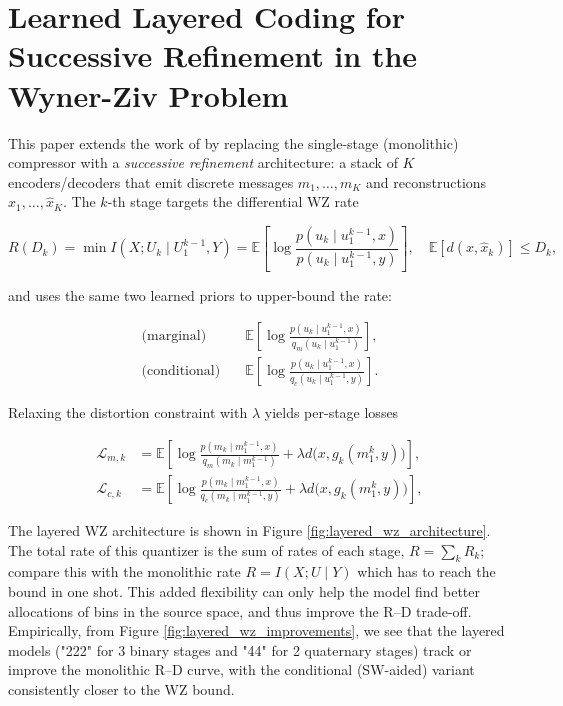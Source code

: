 \section{Learned Layered Coding for Successive Refinement in the Wyner-Ziv Problem}

This paper \cite{JoukovskyLayeredWZ} extends the work of \cite{OzyilkanRecoverBinning} by replacing the single-stage (monolithic) compressor with a \emph{successive refinement} architecture: a stack of $K$ encoders/decoders that emit discrete messages $m_1,\ldots,m_K$ and reconstructions $\hat{x}_1,\ldots,\hat{x}_K$. The $k$-th stage targets the differential WZ rate

\begin{equation}
    R(D_k)=\min I(X;U_k\mid U_1^{k-1},Y)=\mathbb{E}\left[\log\frac{p(u_k\mid u_1^{k-1},x)}{p(u_k\mid u_1^{k-1},y)}\right],\quad \mathbb{E}[d(x,\hat{x}_k)]\le D_k,
\end{equation}

and uses the same two learned priors to upper-bound the rate:

\begin{align}
    \text{(marginal)}\quad &\mathbb{E}\left[\log\frac{p(u_k\mid u_1^{k-1},x)}{q_m(u_k\mid u_1^{k-1})}\right],\\
    \text{(conditional)}\quad &\mathbb{E}\left[\log\frac{p(u_k\mid u_1^{k-1},x)}{q_c(u_k\mid u_1^{k-1},y)}\right].
\end{align}

Relaxing the distortion constraint with $\lambda$ yields per-stage losses

\begin{align}
    \mathcal{L}_{m,k}&=\mathbb{E}\left[\log\frac{p(m_k\mid m_1^{k-1},x)}{q_m(m_k\mid m_1^{k-1})}+\lambda d\big(x,g_k(m_1^{k},y)\big)\right],\\
    \mathcal{L}_{c,k}&=\mathbb{E}\left[\log\frac{p(m_k\mid m_1^{k-1},x)}{q_c(m_k\mid m_1^{k-1},y)}+\lambda d\big(x,g_k(m_1^{k},y)\big)\right],
\end{align}

The layered WZ architecture is shown in Figure \ref{fig:layered_wz_architecture}.
The total rate of this quantizer is the sum of rates of each stage, $R=\sum_k R_k$; compare this with the monolithic rate $R=I(X;U\mid Y)$ which has to reach the bound in one shot. This added flexibility can only help the model find better allocations of bins in the source space, and thus improve the R–D trade-off.
Empirically, from Figure \ref{fig:layered_wz_improvements}, we see that the layered models ("222" for 3 binary stages and "44" for 2 quaternary stages) track or improve the monolithic R–D curve, with the conditional (SW-aided) variant consistently closer to the WZ bound.

